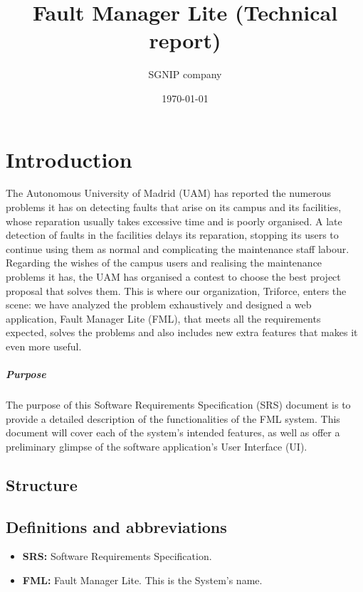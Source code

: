 \documentclass{report}
\title{Fault Manager Lite (Technical report)}
\date{\today}
\author{SGNIP company}
\begin{document}
\maketitle
\tableofcontents
\newpage
\pagestyle{plain}
\begin{abstract}
\end{abstract}

\chapter{Introduction}

The Autonomous University of Madrid (UAM) has reported the numerous problems it has on detecting faults that arise on its campus and its facilities, whose reparation usually takes excessive time and is poorly organised. A late detection of faults in the facilities delays its reparation, stopping its users to continue using them as normal and complicating the maintenance staff labour. Regarding the wishes of the campus users and realising the maintenance problems it has, the UAM has organised a contest to choose the best project proposal that solves them.
This is where our organization, Triforce, enters the scene: we have analyzed the problem exhaustively and designed a web application, Fault Manager Lite (FML), that meets all the requirements expected, solves the problems and also includes new extra features that makes it even more useful.

\paragraph{Purpose} The purpose of this Software Requirements Specification (SRS) document is to provide a detailed description of the functionalities of the FML system. This document will cover each of the system's intended features, as well as offer a preliminary glimpse of the software application's User Interface (UI).

\section{Structure}

\section{Definitions and abbreviations}

\begin{itemize}
\item \textbf{SRS: } Software Requirements Specification.

\item \textbf{FML: } Fault Manager Lite. This is the System's name.

\end{itemize}
\end{document}
